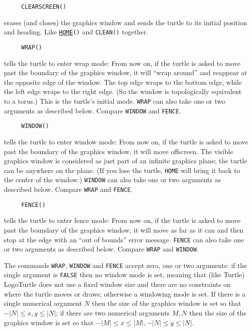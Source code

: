 \begin{verbatim}
     CLEARSCREEN()
\end{verbatim}
erases (and closes) the graphics window and sends the turtle to its
initial position and heading.  Like
\texttt{\hyperref[logoturtle:home]{HOME}()} and \texttt{CLEAN()}
together.

\begin{verbatim}
     WRAP()
\end{verbatim}
tells the turtle to enter wrap mode: From now on, if the turtle is
asked to move past the boundary of the graphics window, it will ``wrap
around'' and reappear at the opposite edge of the window.  The top
edge wraps to the bottom edge, while the left edge wraps to the right
edge.  (So the window is topologically equivalent to a torus.)  This
is the turtle's initial mode.  \texttt{WRAP} can also take one or two
arguments as described below.  Compare \texttt{WINDOW} and
\texttt{FENCE}.

\begin{verbatim}
     WINDOW()
\end{verbatim}
tells the turtle to enter window mode: From now on, if the turtle is
asked to move past the boundary of the graphics window, it will move
offscreen.  The visible graphics window is considered as just part of
an infinite graphics plane; the turtle can be anywhere on the plane.
(If you lose the turtle, \texttt{HOME} will bring it back to the
center of the window.)  \texttt{WINDOW} can also take one or two
arguments as described below.  Compare \texttt{WRAP} and
\texttt{FENCE}.

\begin{verbatim}
     FENCE()
\end{verbatim}
tells the turtle to enter fence mode: From now on, if the turtle is
asked to move past the boundary of the graphics window, it will move
as far as it can and then stop at the edge with an ``out of bounds''
error message.  \texttt{FENCE} can also take one or two arguments as
described below.  Compare \texttt{WRAP} and \texttt{WINDOW}.

The commands \texttt{WRAP}, \texttt{WINDOW} and \texttt{FENCE} accept
zero, one or two arguments: if the single argument is \texttt{FALSE}
then no window mode is set, meaning that (like Turtle) LogoTurtle does
not use a fixed window size and there are no constraints on where the
turtle moves or draws; otherwise a windowing mode is set.  If there is
a single numerical argument $N$ then the size of the graphics window
is set so that $-|N| \le x,y \le |N|$; if there are two numerical
arguments $M, N$ then the size of the graphics window is set so that
$-|M| \le x \le |M|, -|N| \le y \le |N|$.

